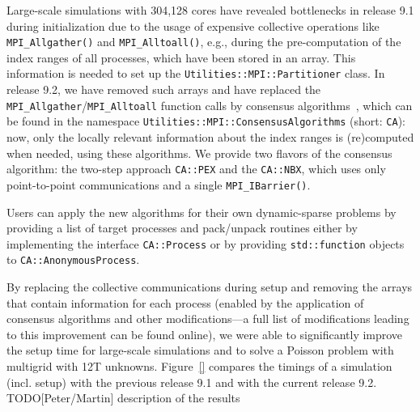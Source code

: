 \documentclass{ansarticle-preprint}
\begin{document}
Large-scale simulations with 304,128 cores have revealed bottlenecks in release 
9.1 during initialization due to the usage of expensive collective operations 
like \texttt{MPI\_Allgather()} and \texttt{MPI\_\allowbreak Alltoall()}, e.g., during the 
pre-computation of the index ranges of all processes, which have been stored in  an array. 
This information is needed to set up 
the  \texttt{Utilities::MPI::Par\-ti\-ti\-oner} class. 
In release 9.2, we have removed such arrays and have replaced 
the \texttt{MPI\_Allgather}/\allowbreak\texttt{MPI\_\allowbreak Alltoall} 
function calls by consensus algorithms~\cite{hoefler2010scalable}, which can be 
found in the namespace \texttt{Utilities::\allowbreak MPI::\allowbreak ConsensusAlgorithms} (short: \texttt{CA}): now, only the locally relevant information about the index ranges is (re)computed when needed, using these algorithms. 
We provide two flavors of the consensus algorithm: the two-step 
approach \texttt{CA::PEX} and the \texttt{CA::NBX}, 
which uses only point-to-point communications and a single \texttt{MPI\_IBarrier()}.


Users can apply the new algorithms for their own dynamic-sparse problems by 
providing a list of target 
processes and pack/unpack routines either by implementing the interface 
\texttt{CA::\allowbreak Process} or by providing \texttt{std::function} 
objects to \texttt{CA::AnonymousProcess}.

By replacing the collective communications during setup and removing the arrays 
that contain information for each process (enabled by the application of consensus 
algorithms and other modifications---a full list of modifications leading to this 
improvement can be found online), we were able to significantly improve the setup 
time for large-scale simulations and to solve a Poisson problem with multigrid 
with 12T unknowns. 
Figure~\ref{} compares the timings of a simulation (incl. setup) with the 
previous release 9.1 and with the current release 9.2. 
{\color{red}TODO[Peter/Martin] description of the results}
\end{document}
